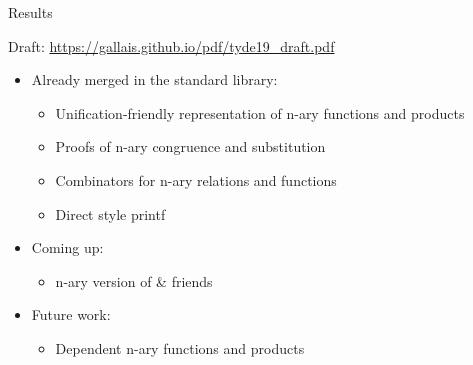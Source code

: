 \documentclass[compress,9pt]{beamer}
\begin{document}
\begin{frame}{Results}

  Draft: {\large\url{https://gallais.github.io/pdf/tyde19_draft.pdf}}
  \bigskip

  \begin{itemize}
    \item Already merged in the standard library:
    \begin{itemize}
      \item Unification-friendly representation of n-ary functions and products
      \item Proofs of n-ary congruence and substitution
      \item Combinators for n-ary relations and functions
      \item Direct style printf
    \end{itemize}
    \bigskip
    \item Coming up:
    \begin{itemize}
      \item n-ary version of  \& friends
    \end{itemize}
    \bigskip
    \item Future work:
    \begin{itemize}
      \item Dependent n-ary functions and products
    \end{itemize}
  \end{itemize}
\end{frame}
\end{document}
